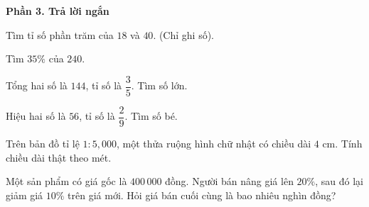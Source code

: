\textbf{Phần 3. Trả lời ngắn}

\begin{ex} %
Tìm tỉ số phần trăm của $18$ và $40$. (Chỉ ghi số).
\end{ex}

\begin{ex} %
Tìm $35\%$ của $240$.
\end{ex}

\begin{ex} %
Tổng hai số là $144$, tỉ số là $\dfrac{3}{5}$. Tìm số lớn.
\end{ex}

\begin{ex} %
Hiệu hai số là $56$, tỉ số là $\dfrac{2}{9}$. Tìm số bé.
\end{ex}

\begin{ex} %
Trên bản đồ tỉ lệ $1 : 5,000$, một thửa ruộng hình chữ nhật có chiều dài $4\text{ cm}$. Tính chiều dài thật theo mét.
\end{ex}

\begin{ex} %
Một sản phẩm có giá gốc là $400\,000$ đồng. Người bán nâng giá lên $20\%$, sau đó lại giảm giá $10\%$ trên giá mới. Hỏi giá bán cuối cùng là bao nhiêu nghìn đồng?
\end{ex}
